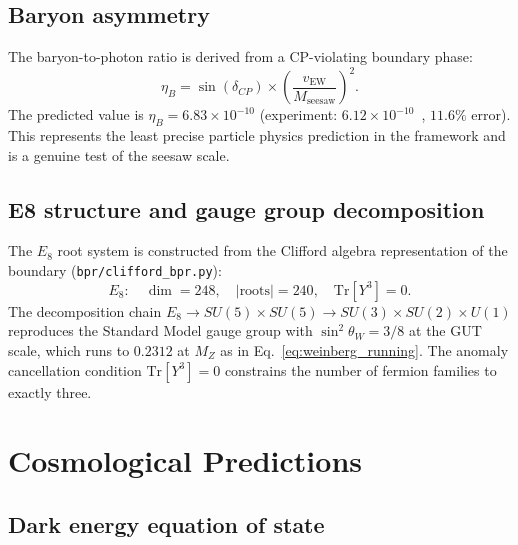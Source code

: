\documentclass[aps,prd,twocolumn,superscriptaddress,longbibliography,nofootinbib]{revtex4-2}
\newcommand{\vEW}{v_{\mathrm{EW}}}
\newcommand{\sinW}{\sin^2\!\theta_W}
\newcommand{\MZ}{M_Z}
\begin{document}
\subsection{Baryon asymmetry}

The baryon-to-photon ratio is derived from a CP-violating boundary
phase:
\begin{equation}
\eta_B = \sin(\delta_{CP}) \times
  \left(\frac{\vEW}{M_{\mathrm{seesaw}}}\right)^{\!2}.
\label{eq:etaB}
\end{equation}
The predicted value is $\eta_B = 6.83 \times 10^{-10}$ (experiment:
$6.12 \times 10^{-10}$~\cite{Planck2018}, $11.6\%$ error).  This
represents the least precise particle physics prediction in the
framework and is a genuine test of the seesaw scale.

\subsection{E8 structure and gauge group decomposition}

The $E_8$ root system is constructed from the Clifford algebra
representation of the boundary (\texttt{bpr/clifford\_bpr.py}):
\begin{equation}
E_8: \quad \dim = 248, \quad |\text{roots}| = 240, \quad
\mathrm{Tr}[Y^3] = 0.
\label{eq:e8}
\end{equation}
The decomposition chain $E_8 \to SU(5) \times SU(5) \to SU(3)
\times SU(2) \times U(1)$ reproduces the Standard Model gauge group
with $\sinW = 3/8$ at the GUT scale, which runs to $0.2312$ at
$\MZ$ as in Eq.~\eqref{eq:weinberg_running}.  The anomaly
cancellation condition $\mathrm{Tr}[Y^3] = 0$ constrains the number
of fermion families to exactly three.


\section{Cosmological Predictions}
\label{sec:cosmo}

\subsection{Dark energy equation of state}
\end{document}
